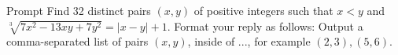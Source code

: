 
\begin{prompt}{Prompt}
Find 32 distinct pairs $(x, y)$ of positive integers such that $x<y$ and
$\sqrt[3]{{7x^2-13xy+7y^2}} = |x-y|+1.$
Format your reply as follows:
Output a comma-separated list of pairs $(x, y)$, inside of $\boxed{...}$, for example $\boxed{(2,3), (5,6)}$.
\end{prompt}
\vspace{-4mm}
\begin{minipage}[t]{0.50\textwidth}
    
\end{minipage}
\hfill
\begin{minipage}[t]{0.48\textwidth}
    
\end{minipage}


